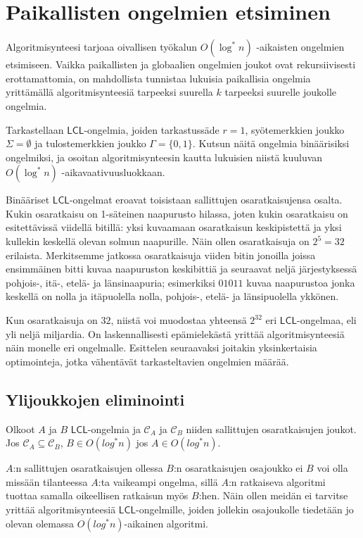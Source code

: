 \documentclass[12pt,finnish]{tktltiki2}
\theoremstyle{definition}
\theoremstyle{remark}
\newcommand*{\lcl}{\ensuremath{\mathsf{LCL}}}
\begin{document}
\section{Paikallisten ongelmien etsiminen}
Algoritmisynteesi tarjoaa oivallisen työkalun $O(\log^* n)$ -aikaisten ongelmien etsimiseen. Vaikka paikallisten ja globaalien ongelmien joukot ovat rekursiivisesti erottamattomia, on mahdollista tunnistaa lukuisia paikallisia ongelmia yrittämällä algoritmisynteesiä tarpeeksi suurella $k$ tarpeeksi suurelle joukolle ongelmia.


Tarkastellaan \lcl -ongelmia, joiden tarkastussäde $r = 1$, syötemerkkien joukko $\Sigma = \emptyset$ ja tulostemerkkien joukko $\Gamma = \{0, 1\}$. Kutsun näitä ongelmia binäärisiksi ongelmiksi, ja osoitan algoritmisynteesin kautta lukuisien niistä kuuluvan $O(\log^* n)$ -aikavaativuusluokkaan.

Binääriset \lcl -ongelmat eroavat toisistaan sallittujen osaratkaisujensa osalta. Kukin osaratkaisu on 1-säteinen naapurusto hilassa, joten kukin osaratkaisu on esitettävissä viidellä bitillä: yksi kuvaamaan osaratkaisun keskipistettä ja yksi kullekin keskellä olevan solmun naapurille. Näin ollen osaratkaisuja on $2^5 = 32$ erilaista. Merkitsemme jatkossa osaratkaisuja viiden bitin jonoilla joissa ensimmäinen bitti kuvaa naapuruston keskibittiä ja seuraavat neljä järjestyksessä pohjois-, itä-, etelä- ja länsinaapuria; esimerkiksi $01011$ kuvaa naapurustoa jonka keskellä on nolla ja itäpuolella nolla, pohjois-, etelä- ja länsipuolella ykkönen.

Kun osaratkaisuja on $32$, niistä voi muodostaa yhteensä $2^{32}$ eri \lcl -ongelmaa, eli yli neljä miljardia. On laskennallisesti epämielekästä yrittää algoritmisynteesiä näin monelle eri ongelmalle. Esittelen seuraavaksi joitakin yksinkertaisia optimointeja, jotka vähentävät tarkasteltavien ongelmien määrää.

\subsection{Ylijoukkojen eliminointi}
Olkoot $A$ ja $B$ \lcl -ongelmia ja $\mathcal{C}_A$ ja $\mathcal{C}_B$  niiden sallittujen osaratkaisujen joukot. Jos $\mathcal{C}_A \subseteq \mathcal{C}_B$, $B \in O(log^* n)$ jos $A \in O(log^* n)$.

$A$:n sallittujen osaratkaisujen ollessa $B$:n osaratkaisujen osajoukko ei $B$ voi olla missään tilanteessa $A$:ta vaikeampi ongelma, sillä $A$:n ratkaiseva algoritmi tuottaa samalla oikeellisen ratkaisun myös $B$:hen. Näin ollen meidän ei tarvitse yrittää algoritmisynteesiä \lcl -ongelmille, joiden jollekin osajoukolle tiedetään jo olevan olemassa $O(log^* n)$-aikainen algoritmi.
\end{document}

